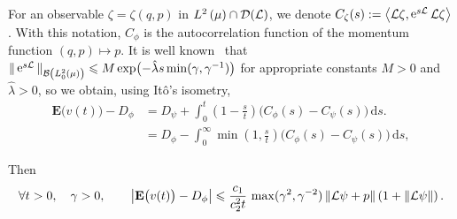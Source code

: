 \documentclass[11pt,a4paper]{article}
\DeclareMathOperator{\e}{e}
\newcommand{\expect}[0]{\mathbf{E}}
\renewcommand{\d}{\mathrm d}
\theoremstyle{plain}
\numberwithin{equation}{section}
\renewcommand{\leq}{\leqslant}
\begin{document}
For an observable $\zeta = \zeta(q, p)$ in $\lp{2}{\mu} \cap \mathcal D(\mathcal L)$,
we denote $C_{\zeta}(s) := \ip{\mathcal L \zeta}{\e^{s \mathcal L} \mathcal L \zeta}$.
With this notation, $C_{\phi}$ is the autocorrelation function of the momentum function $(q, p) \mapsto p$.
It is well known~\cite{roussel2018spectral} that $\norm*{ \e^{s \mathcal L} }[\mathcal B \left(L^2_0\left(\mu\right) \right)] \leq M \exp \bigl(- \hat \lambda s \min(\gamma, \gamma^{-1}) \bigr)$
for appropriate constants $M > 0$ and $\hat \lambda > 0$,
so we obtain, using It\^o's isometry,
\begin{align*}
    \expect \bigl(v(t)\bigr) - D_{\phi}
    &= D_{\psi} + \int_{0}^{t} \left(1 - \frac{s}{t}\right) \bigl( C_{\phi}(s) - C_{\psi}(s) \bigr) \, \d s. \\
    &= D_{\phi} - \int_{0}^{\infty} \min\left(1, \frac{s}{t}\right) \bigl( C_{\phi}(s) - C_{\psi}(s) \bigr) \, \d s,
\end{align*}

Then
\begin{align*}
    \forall t > 0, \quad \gamma > 0, \qquad
    \abs{\expect \bigl( v(t) \bigr) - D_{\phi}}
    \leq \frac{c_1}{c_2^2 t} \, \max(\gamma^2, \gamma^{-2}) \norm{\mathcal L\psi + p}  \left(1 + \norm{\mathcal L \psi} \right).
\end{align*}
\end{document}
